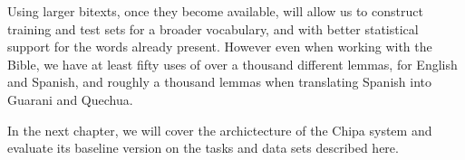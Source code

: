 Using larger bitexts, once they become available, will allow us to construct
training and test sets for a broader vocabulary, and with better statistical
support for the words already present. However even when working with the Bible,
we have at least fifty uses of over a thousand different lemmas, for English and
Spanish, and roughly a thousand lemmas when translating Spanish into Guarani and
Quechua.

In the next chapter, we will cover the archictecture of the Chipa system and
evaluate its baseline version on the tasks and data sets described here.
